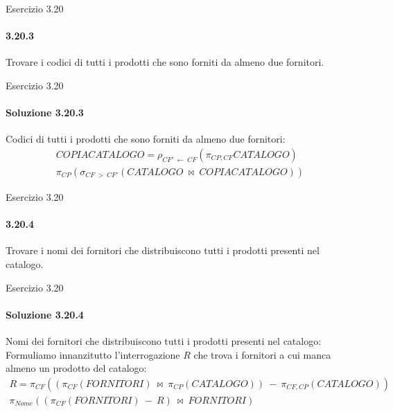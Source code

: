 %
\begin{frame}{Esercizio 3.20}
    \framesubtitle{3.20.3}
    \vspace{-3.cm}
    \vspace{.3cm}

    Trovare i codici di tutti i prodotti che sono forniti da almeno due fornitori.
\end{frame}
%
\begin{frame}{Esercizio 3.20}
    \framesubtitle{Soluzione 3.20.3}
    \vspace*{-2cm}
    \vspace{.3cm}

    {\small Codici di tutti i prodotti che sono forniti da almeno due fornitori:}
    \small
    \begin{gather*}
        COPIACATALOGO = \rho_{CF'~\leftarrow~CF} (\pi_{CP,CF} CATALOGO)\\
        \pi_{CP} (\sigma_{CF~>~CF'} (CATALOGO~\bowtie~COPIACATALOGO))
    \end{gather*}
\end{frame}
%
\begin{frame}{Esercizio 3.20}
    \framesubtitle{3.20.4}
    \vspace{-3.cm}
    \vspace{.3cm}

    Trovare i nomi dei fornitori che distribuiscono tutti i prodotti presenti nel catalogo.
\end{frame}
%
\begin{frame}{Esercizio 3.20}
    \framesubtitle{Soluzione 3.20.4}
    \vspace*{-1cm}
    \vspace{.3cm}

    {\small Nomi dei fornitori che distribuiscono tutti i prodotti presenti nel catalogo:}
    \small
    \newline
    {\\Formuliamo innanzitutto l'interrogazione $R$ che trova i fornitori a cui manca almeno un prodotto del catalogo:\\}
    \vspace{-.5cm}
    \begin{gather*}
        R = \pi_{CF}((\pi_{CF} (FORNITORI)~\bowtie~\pi_{CP}(CATALOGO))~-~\pi_{CF,CP}(CATALOGO))\\
        \pi_{Nome}((\pi_{CF}(FORNITORI)~-~R)~\bowtie~FORNITORI)
    \end{gather*}
\end{frame}
